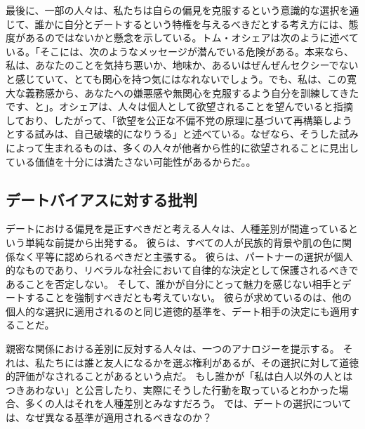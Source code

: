 \documentclass[paper=a4,book,openany]{jlreq}
\begin{document}
最後に、一部の人々は、私たちは自らの偏見を克服するという意識的な選択を通じて、誰かに自分とデートするという特権を与えるべきだとする考え方には、態度があるのではないかと懸念を示している。トム・オシェアは次のように述べている。「そこには、次のようなメッセージが潜んでいる危険がある。本来なら、私は、あなたのことを気持ち悪いか、地味か、あるいはぜんぜんセクシーでないと感じていて、とても関心を持つ気にはなれないでしょう。でも、私は、この寛大な義務感から、あなたへの嫌悪感や無関心を克服するよう自分を訓練してきたです、と」。オシェアは、人々は個人として欲望されることを望んでいると指摘しており、したがって、「欲望を公正な不偏不党の原理に基づいて再構築しようとする試みは、自己破壊的になりうる」と述べている。なぜなら、そうした試みによって生まれるものは、多くの人々が他者から性的に欲望されることに見出している価値を十分には満たさない可能性があるからだ\citep{oshea20:_sexual_desir_struc_injus}。。

\subsection{デートバイアスに対する批判}

デートにおける偏見を是正すべきだと考える人々は、人種差別が間違っているという単純な前提から出発する。
彼らは、すべての人が民族的背景や肌の色に関係なく平等に認められるべきだと主張する。
彼らは、パートナーの選択が個人的なものであり、リベラルな社会において自律的な決定として保護されるべきであることを否定しない。
そして、誰かが自分にとって魅力を感じない相手とデートすることを強制すべきだとも考えていない。
彼らが求めているのは、他の個人的な選択に適用されるのと同じ道徳的基準を、デート相手の決定にも適用することだ。

親密な関係における差別に反対する人々は、一つのアナロジーを提示する。
それは、私たちには誰と友人になるかを選ぶ権利があるが、その選択に対して道徳的評価がなされることがあるという点だ。
もし誰かが「私は白人以外の人とはつきあわない」と公言したり、実際にそうした行動を取っているとわかった場合、多くの人はそれを人種差別とみなすだろう。
では、デートの選択については、なぜ異なる基準が適用されるべきなのか？
\end{document}

